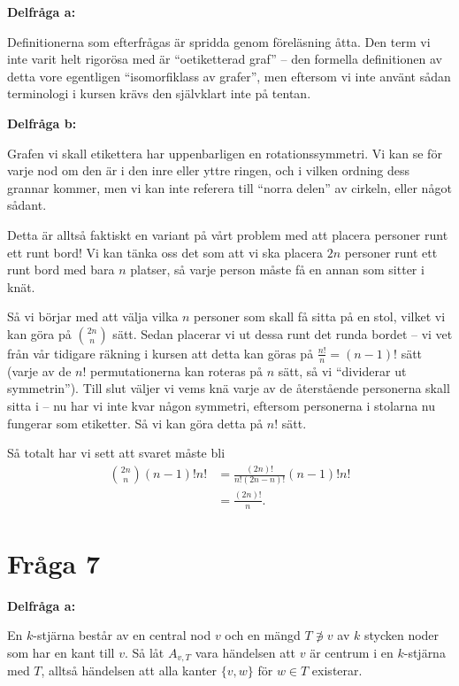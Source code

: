 \documentclass[nobib]{tufte-handout}
\begin{document}
\noindent\textbf{Delfråga a:}

Definitionerna som efterfrågas är spridda genom föreläsning åtta. Den term vi inte varit helt rigorösa med är ``oetiketterad graf'' -- den formella definitionen av detta vore egentligen ``isomorfiklass av grafer'', men eftersom vi inte använt sådan terminologi i kursen krävs den självklart inte på tentan.

\noindent\textbf{Delfråga b:}

Grafen vi skall etikettera har uppenbarligen en rotationssymmetri. Vi kan se för varje nod om den är i den inre eller yttre ringen, och i vilken ordning dess grannar kommer, men vi kan inte referera till ``norra delen'' av cirkeln, eller något sådant.

Detta är alltså faktiskt en variant på vårt problem med att placera personer runt ett runt bord! Vi kan tänka oss det som att vi ska placera $2n$ personer runt ett runt bord med bara $n$ platser, så varje person måste få en annan som sitter i knät.

Så vi börjar med att välja vilka $n$ personer som skall få sitta på en stol, vilket vi kan göra på $\binom{2n}{n}$ sätt. Sedan placerar vi ut dessa runt det runda bordet -- vi vet från vår tidigare räkning i kursen att detta kan göras på $\frac{n!}{n} = (n-1)!$ sätt (varje av de $n!$ permutationerna kan roteras på $n$ sätt, så vi ``dividerar ut symmetrin''). Till slut väljer vi vems knä varje av de återstående personerna skall sitta i -- nu har vi inte kvar någon symmetri, eftersom personerna i stolarna nu fungerar som etiketter. Så vi kan göra detta på $n!$ sätt.

Så totalt har vi sett att svaret måste bli 
\begin{align*}
  \binom{2n}{n}(n-1)!n! &= \frac{(2n)!}{n!(2n-n)!}(n-1)!n!\\
  &= \frac{(2n)!}{n}.
\end{align*}

\section{Fråga 7}

\noindent\textbf{Delfråga a:}

En $k$-stjärna består av en central nod $v$ och en mängd $T\not\ni v$ av $k$ stycken noder som har en kant till $v$. Så låt $A_{v, T}$ vara händelsen att $v$ är centrum i en $k$-stjärna med $T$, alltså händelsen att alla kanter $\{v,w\}$ för $w\in T$ existerar.
\end{document}
